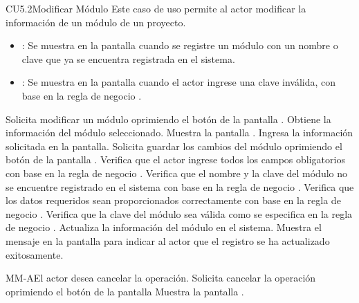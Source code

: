 \begin{UseCase}{CU5.2}{Modificar Módulo}{
		Este caso de uso permite al actor modificar la información de un módulo de un proyecto.
	}
{\begin{itemize}
		\item {}: Se muestra en la pantalla  cuando se registre un módulo con un nombre o clave que ya se encuentra registrada en el sistema.
		\item {}: Se muestra en la pantalla  cuando el actor ingrese una clave inválida, con base en la regla de negocio .
		\end{itemize}
		}
	\end{UseCase}
	\begin{UCtrayectoria}
		\UCpaso[\UCactor] Solicita modificar un módulo oprimiendo el botón \editar de la pantalla .
		\UCpaso[\UCsist] Obtiene la información del módulo seleccionado.
		\UCpaso[\UCsist] Muestra la pantalla .
		\UCpaso[\UCactor] Ingresa la información solicitada en la pantalla. \label{CU5.2-P4}
		\UCpaso[\UCactor] Solicita guardar los cambios del módulo oprimiendo el botón  de la pantalla . 
		\UCpaso[\UCsist] Verifica que el actor ingrese todos los campos obligatorios con base en la regla de negocio . 
		\UCpaso[\UCsist] Verifica que el nombre y la clave del módulo no se encuentre registrado en el sistema con base en la regla de negocio . 
		\UCpaso[\UCsist] Verifica que los datos requeridos sean proporcionados correctamente con base en la regla de negocio .  
		\UCpaso[\UCsist] Verifica que la clave del módulo sea válida como se especifica en la regla de negocio . 
		\UCpaso[\UCsist] Actualiza la información del módulo en el sistema.
		\UCpaso[\UCsist] Muestra el mensaje  en la pantalla  para indicar al actor que el registro se ha actualizado exitosamente.
	\end{UCtrayectoria}		
	
	\begin{UCtrayectoriaA}{MM-A}{El actor desea cancelar la operación.}
		\UCpaso[\UCactor] Solicita cancelar la operación oprimiendo el botón  de la pantalla 
		\UCpaso[\UCsist] Muestra la pantalla .
	\end{UCtrayectoriaA}

